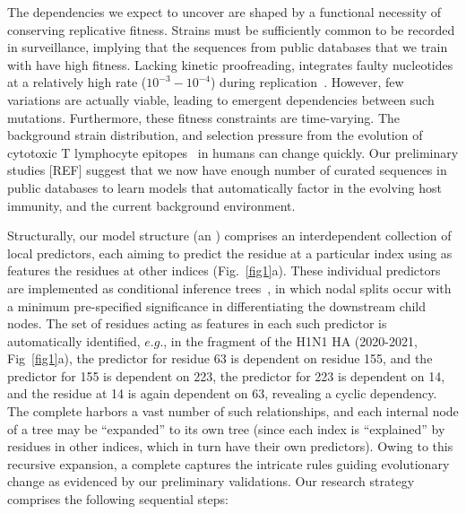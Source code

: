 \documentclass[onecolumn, compsoc,12pt]{IEEEtran}
\begin{document}
The dependencies we expect to uncover are shaped by  a  functional necessity of conserving replicative  fitness. Strains must be sufficiently common  to be recorded in surveillance, implying that the sequences from public databases that we train  with have  high  fitness. Lacking kinetic proofreading, \infl integrates  faulty nucleotides   at a relatively high rate ($10^{-3}-10^{-4}$) during  replication~\cite{ahlquist2002rna,chen2006avian}. However, few variations are actually viable, leading to emergent dependencies between such mutations. Furthermore, these fitness constraints are  time-varying. The background strain distribution, and selection pressure from the evolution of cytotoxic T lymphocyte  epitopes~\cite{woolthuis2016long,fan2012role,van2016differential,berkhoff2007assessment,van2012evasion} in humans can change quickly. Our preliminary studies [REF] suggest that we now have enough number of curated sequences in public databases to learn models that    automatically factor in the evolving host immunity, and the current background environment.  

Structurally, our model structure (an \enet) comprises an interdependent collection of  local predictors, each aiming to predict the  residue at a particular index  using as features  the residues   at other  indices  (Fig.~\ref{fig1}a). These individual predictors are implemented as conditional inference trees~\cite{Hothorn06unbiasedrecursive}, in which  nodal splits  occur with  a minimum pre-specified significance in differentiating the  downstream child nodes. The set of residues acting as features in each such predictor is automatically identified, $e.g.$, in the fragment of the  H1N1 HA \enet (2020-2021, Fig~\ref{fig1}a), the predictor for residue 63 is dependent on   residue  155, and the predictor for  155 is dependent on  223, the predictor for  223 is dependent on  14, and the residue at  14 is again dependent on  63, revealing a cyclic dependency. The complete \enet harbors a vast number of such  relationships, and each internal node of a tree may be  ``expanded'' to its own tree (since each index is ``explained'' by residues in other indices, which in turn have their own predictors). Owing to this recursive expansion,  a complete \enet  captures the intricate rules guiding evolutionary change as evidenced by our preliminary validations. Our research strategy comprises the following sequential steps:
\end{document}
